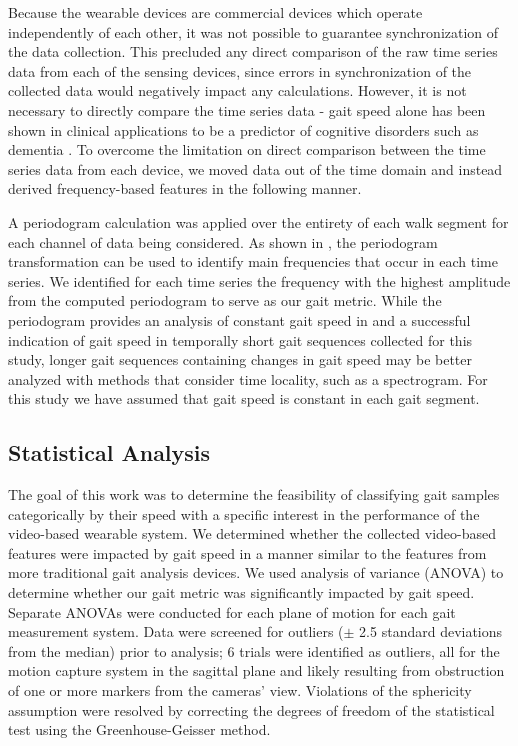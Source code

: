 \documentclass[12pt]{report}
\begin{document}
Because the wearable devices are commercial devices which operate independently of each other, it was not possible to guarantee synchronization of the data collection. This precluded any direct comparison of the raw time series data from each of the sensing devices, since errors in synchronization of the collected data would negatively impact any calculations. However, it is not necessary to directly compare the time series data - gait speed alone has been shown in clinical applications to be a predictor of cognitive disorders such as dementia \cite{Bramell-Risberg2005LowerControls}. To overcome the limitation on direct comparison between the time series data from each device, we moved data out of the time domain and instead derived frequency-based features in the following manner. 

A periodogram calculation was applied over the entirety of each walk segment for each channel of data being considered. As shown in \cite{Schneider2017PreliminaryProcessing}, the periodogram transformation can be used to identify main frequencies that occur in each time series. We identified for each time series the frequency with the highest amplitude from the computed periodogram to serve as our gait metric. While the periodogram provides an analysis of constant gait speed in \cite{Schneider2017PreliminaryProcessing} and a successful indication of gait speed in temporally short gait sequences collected for this study, longer gait sequences containing changes in gait speed may be better analyzed with methods that consider time locality, such as a spectrogram. For this study we have assumed that gait speed is constant in each gait segment.

\subsection{Statistical Analysis}
The goal of this work was to determine the feasibility of classifying gait samples categorically by their speed with a specific interest in the performance of the video-based wearable system. We determined whether the collected video-based features were impacted by gait speed in a manner similar to the features from more traditional gait analysis devices. We used analysis of variance (ANOVA) to determine whether our gait metric was significantly impacted by gait speed. Separate ANOVAs were conducted for each plane of motion for each gait measurement system. Data were screened for outliers ($\pm$ 2.5 standard deviations from the median) prior to analysis; 6 trials were identified as outliers, all for the motion capture system in the sagittal plane and likely resulting from obstruction of one or more markers from the cameras' view. Violations of the sphericity assumption were resolved by correcting the degrees of freedom of the statistical test using the Greenhouse-Geisser method.
\end{document}
